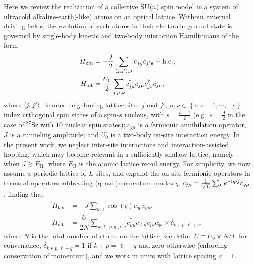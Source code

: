 \documentclass[nofootinbib,twocolumn]{revtex4-2}
\renewcommand{\t}{\text} %
\newcommand{\f}[2]{\dfrac{#1}{#2}} %
\newcommand{\p}[1]{\left(#1\right)} %
\renewcommand{\set}[1]{\left\{#1\right\}} %
\newcommand{\bk}{\Braket} %
\renewcommand{\c}{\cdot} %
\renewcommand{\i}{\mathrm{i}\mkern1mu} %
\newcommand{\1}{\mathds{1}}
\begin{document}
Here we review the realization of a collective SU($n$) spin model in a system of ultracold alkaline-earth(-like) atoms on an optical lattice.
Without external driving fields, the evolution of such atoms in their electronic ground state is governed by single-body kinetic and two-body interaction Hamiltonians of the form
\begin{align}
  H_{\t{kin}}
  &= -\f{J}{2} \sum_{\bk{j,j'},\mu} c_{j\mu}^\dag c_{j'\mu} + \t{h.c.}, \\
  H_{\t{int}}
  &= \f{U_0}{2} \sum_{j,\mu,\nu}
  c_{j\mu}^\dag c_{j\mu} c_{j\nu}^\dag c_{j\nu},
\end{align}
where $\bk{j,j'}$ denotes neighboring lattice sites $j$ and $j'$; $\mu,\nu\in\set{s,s-1,\cdots,-s}$ index orthogonal spin states of a spin-$s$ nucleus, with $s=\frac{n-1}{2}$ (e.g.~$s=\frac{9}{2}$ in the case of ${}^{87}$Sr with $10$ nuclear spin states); $c_{j\mu}$ is a fermionic annihilation operator, $J$ is a tunneling amplitude; and $U_0$ is a two-body on-site interaction energy.
In the present work, we neglect inter-site interactions and interaction-assisted hopping, which may become relevant in a sufficiently shallow lattice, namely when $J\gtrsim E_{\t{R}}$, where $E_{\t{R}}$ is the atomic lattice recoil energy.
For simplicity, we now assume a periodic lattice of $L$ sites, and expand the on-site fermionic operators in terms of operators addressing (quasi-)momentum modes $q$, $c_{j\mu}=\frac1{\sqrt{L}}\sum_k e^{-\i q\c j} c_{q\mu}$, finding that
\begin{align}
  H_{\t{kin}}
  &= -J\sum_{q,\mu} \cos\p{q} c_{q\mu}^\dag c_{q\mu}, \\
  H_{\t{int}}
  &= \f{U}{2N} \sum_{k,\ell,p,q,\mu,\nu}
  c_{k\mu}^\dag c_{\ell\mu} c_{p\nu}^\dag c_{q\nu}
  \times \delta_{k+p,\ell+q},
  \label{eq:H_int_momenta}
\end{align}
where $N$ is the total number of atoms on the lattice, we define $U\equiv U_0\times N/L$ for convenience, $\delta_{k+p,\ell+q}=1$ if $k+p=\ell+q$ and zero otherwise (enforcing conservation of momentum), and we work in units with lattice spacing $a=1$.
\end{document}
